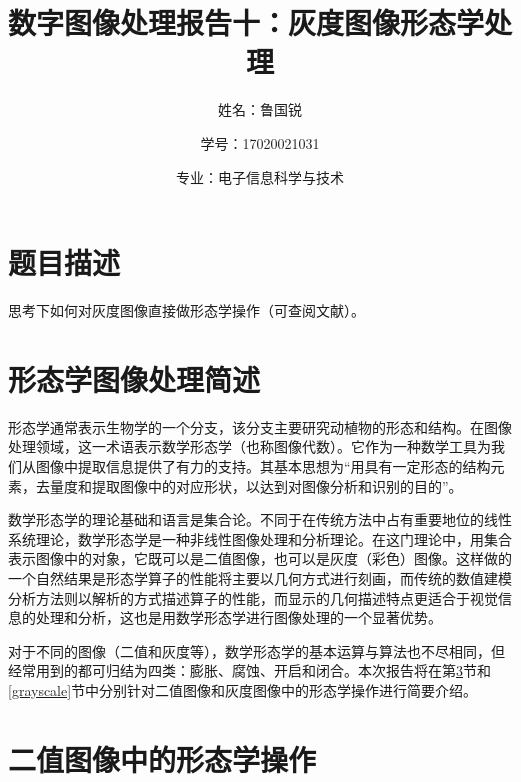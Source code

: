 \documentclass[UTF8]{ctexart}
\title{数字图像处理报告十：灰度图像形态学处理}
\author{姓名：鲁国锐 \protect\newline
\and 学号：17020021031 \\
\and 专业：电子信息科学与技术}
\begin{document}
	\maketitle
	\renewcommand{\contentsname}{目录}
	\renewcommand{\listfigurename}{插图目录}
	\renewcommand{\listtablename}{表格目录}
	\renewcommand{\refname}{参考文献}
	\renewcommand{\abstractname}{摘要}
	\renewcommand{\indexname}{索引}
	\renewcommand{\tablename}{表}
	\renewcommand{\figurename}{图}
	
	
	
	\tableofcontents
	\newpage
	
	\hypersetup{
	bookmarks=true,
	colorlinks=true,
	linkcolor=red,
	urlcolor=blue
	}
    
    
	\section{题目描述}
	\indent 思考下如何对灰度图像直接做形态学操作（可查阅文献）。

			
    \section{形态学图像处理简述}\label{introduction}
        
        \indent 形态学通常表示生物学的一个分支，该分支主要研究动植物的形态和结构\cite{digit_image_Gonzalez}。在图像处理领域，这一术语表示数学形态学（也称图像代数）。它作为一种数学工具为我们从图像中提取信息提供了有力的支持。其基本思想为“用具有一定形态的结构元素，去量度和提取图像中的对应形状，以达到对图像分析和识别的目的”\cite{zhang2005图像工程}。
        
        \indent 数学形态学的理论基础和语言是集合论。不同于在传统方法中占有重要地位的线性系统理论，数学形态学是一种非线性图像处理和分析理论\cite{冯桂2000灰度图像边缘检测中的形态学方法}。在这门理论中，用集合表示图像中的对象，它既可以是二值图像，也可以是灰度（彩色）图像。这样做的一个自然结果是形态学算子的性能将主要以几何方式进行刻画，而传统的数值建模分析方法则以解析的方式描述算子的性能，而显示的几何描述特点更适合于视觉信息的处理和分析\cite{冯桂2000灰度图像边缘检测中的形态学方法}，这也是用数学形态学进行图像处理的一个显著优势。
        
        \indent 对于不同的图像（二值和灰度等），数学形态学的基本运算与算法也不尽相同，但经常用到的都可归结为四类：膨胀、腐蚀、开启和闭合。本次报告将在第\ref{binary}节和\ref{grayscale}节中分别针对二值图像和灰度图像中的形态学操作进行简要介绍。
    
    
    \section{二值图像中的形态学操作}\label{binary}
        
\end{document}
